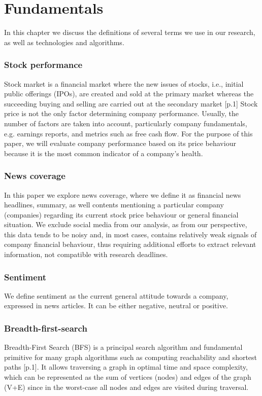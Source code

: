 \chapter{Fundamentals}
\label{cha:fundamentals}

In this chapter we discuss the definitions of several terms we use in our research, as well as technologies and algorithms.

\subsection{Stock performance}
\label{cha:stock-performance}
Stock market is a financial market where the new issues of stocks, i.e., initial public offerings (IPOs), are created and sold at the primary market whereas the succeeding buying and selling are carried out at the secondary market [p.1]
Stock price is not the only factor determining company performance. Usually, the number of factors are taken into account, particularly company fundamentals, e.g. earnings reports, and metrics such as free cash flow.
For the purpose of this paper, we will evaluate company performance based on its price behaviour because it is the most common indicator of a company's health.
\subsection{News coverage}
\label{cha:news-coverage}
In this paper we explore news coverage, where we define it as financial news headlines, summary, as well contents mentioning a particular company (companies) regarding its current stock price behaviour or general financial situation.
We exclude social media from our analysis, as from our perspective, this data tends to be noisy and, in most cases, contains relatively weak signals of company financial behaviour, thus requiring additional efforts to extract relevant information, not compatible with research deadlines.

\subsection{Sentiment}
\label{cha:sentiment}
We define sentiment as the current general attitude towards a company, expressed in news articles. It can be either negative, neutral or positive.

\subsection{Breadth-first-search}
\label{cha:breadth-first-search}
Breadth-First Search (BFS) is a principal search algorithm and fundamental primitive for many graph algorithms such as computing reachability and shortest paths [p.1]. It allows traversing a graph in optimal time and space complexity, which can be represented as the sum of vertices (nodes) and edges of the graph (V+E) since in the worst-case all nodes and edges are visited during traversal.


